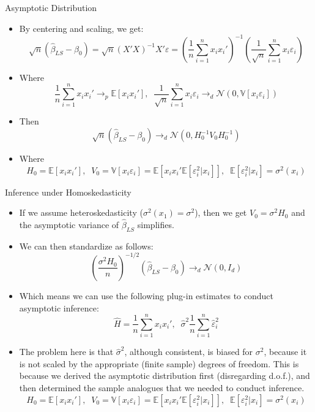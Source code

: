 \documentclass[fleqn, 10pt]{beamer}
\newcommand{\E}{\mathbb{E}}
\newcommand{\V}{\mathbb{V}}
\begin{document}
\begin{frame}{Asymptotic Distribution}
	
	\begin{itemize}
		\item By centering and scaling, we get:
		\[ \sqrt{n} \left( \hat{\beta}_{LS} - \beta_0 \right) = \sqrt{n} (X'X)^{-1}X'\varepsilon =  \left( \frac{1}{n} \sum_{i=1}^{n} x_i x_i' \right)^{-1} \left( \frac{1}{\sqrt{n}} \sum_{i=1}^{n} x_i \varepsilon_i \right) \]
		\item Where
		\[ \frac{1}{n} \sum_{i=1}^{n} x_i x_i' \to_p \E[x_i x_i'], \;\; \frac{1}{\sqrt{n}} \sum_{i=1}^{n} x_i \varepsilon_i \to_d \mathcal{N} (0, \V[x_i\varepsilon_i]) \]
		\item Then
		\[ \sqrt{n} \left( \hat{\beta}_{LS} - \beta_0 \right) \to_d \mathcal{N} (0, H_0^{-1} V_0 H_0^{-1}) \]
		\item Where
		\[ H_0 = \E[x_i x_i'], \;\; V_0 = \V[x_i \varepsilon_i] = \E[x_i x_i' \E[\varepsilon_i^2|x_i]], \;\; \E[\varepsilon_i^2|x_i] = \sigma^2(x_i) \]
	\end{itemize}
	
\end{frame}

\begin{frame}{Inference under Homoskedasticity}
	
	\begin{itemize}
		\item If we assume heteroskedasticity (\( \sigma^2(x_1) = \sigma^2 \)), then we get \( V_0 = \sigma^2 H_0 \) and the asymptotic variance of \(\hat{\beta}_{LS} \) simplifies.
		\item We can then standardize as follows:
		\[ \left( \frac{\sigma^2 H_0}{n} \right)^{-1/2} \left( \hat{\beta}_{LS} - \beta_0 \right) \to_d \mathcal{N} (0, I_d) \]
		\item Which means we can use the following plug-in estimates to conduct asymptotic inference:
		\[ \hat{H} = \frac{1}{n} \sum_{i=1}^{n} x_i x_i', \;\; \hat{\sigma}^2 \frac{1}{n} \sum_{i=1}^{n} \hat{\varepsilon}_i^2 \]
		\item The problem here is that \( \hat{\sigma}^2 \), although consistent, is biased for \( \sigma^2 \), because it is not scaled by the appropriate (finite sample) degrees of freedom. This is because we derived the asymptotic distribution first (disregarding d.o.f.), and then determined the sample analogues that we needed to conduct inference.
		\[ H_0 = \E[x_i x_i'], \;\; V_0 = \V[x_i \varepsilon_i] = \E[x_i x_i' \E[\varepsilon_i^2|x_i]], \;\; \E[\varepsilon_i^2|x_i] = \sigma^2(x_i) \]
	\end{itemize}
	
\end{frame}
\end{document}
